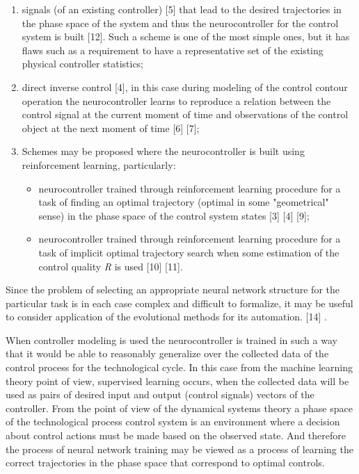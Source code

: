 \documentclass{article}
\begin{document}
\begin{minipage}[t]{0.45\textwidth}
\begin{enumerate}[label={\arabic*)}, start=2,  noitemsep]
    \item[] signals (of an existing controller) [5] that lead to the desired trajectories in the phase space of the system and thus the neurocontroller for the control system is built [12]. Such a scheme is one of the most simple ones, but it has flaws such as a requirement to have a representative set of the existing physical controller statistics;

    \item direct inverse control [4], in this case during modeling of the control contour operation the neurocontroller learns to reproduce a relation between the control signal at the current moment of time and observations of the control object at the next moment of time [6] [7];

    \item Schemes may be proposed where the neurocontroller is built using reinforcement learning, particularly:

\begin{itemize}[noitemsep,topsep=2pt]
    \item neurocontroller trained through reinforcement learning procedure for a task of finding an optimal trajectory (optimal in some "geometrical" sense) in the phase space of the control system states [3] [4] [9];
    \item neurocontroller trained through reinforcement learning procedure for a task of implicit optimal trajectory search when some estimation of the control quality \textit{R} is used [10] [11].
\end{itemize}
\end{enumerate}

    \vspace*{-0.8em} Since the problem of selecting an appropriate neural network structure for the particular task is in each case complex and difficult to formalize, it may be useful to consider application of the evolutional methods for its automation. [14] .

    \hspace{0.2cm} When controller modeling is used the neurocontroller is trained in such a way that it would be able to reasonably generalize over the collected data of the control process for the technological cycle. In this case from the machine learning theory point of view, supervised learning occurs, when the collected data will be used as pairs of desired input and output (control signals) vectors of the controller. From the point of view of the dynamical systems theory a phase space of the technological process control system is an environment where a decision about control actions must be made based on the observed state. And therefore the process of neural network training may be viewed as a process of learning the correct trajectories in the phase space that correspond to optimal controls.


\end{minipage}
\end{document}
